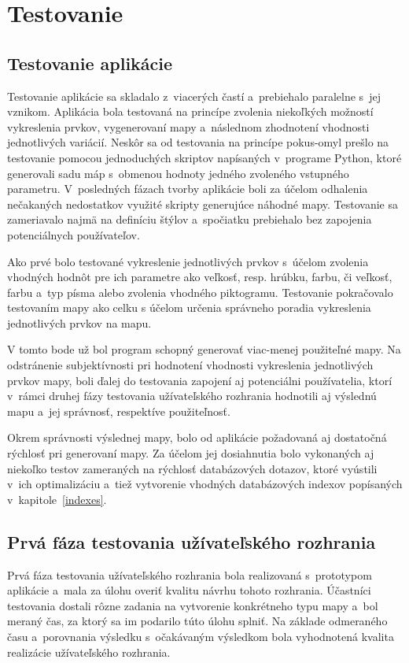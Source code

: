 \chapter{Testovanie}
\label{testing}
\section{Testovanie aplikácie}
Testovanie aplikácie sa skladalo z~viacerých častí a~prebiehalo paralelne s~jej vznikom. Aplikácia bola testovaná na princípe zvolenia niekoľkých možností vykreslenia prvkov, vygenerovaní mapy a~následnom zhodnotení vhodnosti jednotlivých variácií. Neskôr sa od testovania na princípe pokus-omyl prešlo na testovanie pomocou jednoduchých skriptov napísaných v~programe Python, ktoré generovali sadu máp s~obmenou hodnoty jedného zvoleného vstupného parametru. V~posledných fázach tvorby aplikácie boli za účelom odhalenia nečakaných nedostatkov využité skripty generujúce náhodné mapy. Testovanie sa zameriavalo najmä na definíciu štýlov a~spočiatku prebiehalo bez zapojenia potenciálnych používateľov.

Ako prvé bolo testované vykreslenie jednotlivých prvkov s~účelom zvolenia vhodných hodnôt pre ich parametre ako veľkosť, resp. hrúbku, farbu, či veľkosť, farbu a~typ písma alebo zvolenia vhodného piktogramu. Testovanie pokračovalo testovaním mapy ako celku s účelom určenia správneho poradia vykreslenia jednotlivých prvkov na mapu. 

V tomto bode už bol program schopný generovať viac-menej použiteľné mapy. Na odstránenie subjektívnosti pri hodnotení vhodnosti vykreslenia jednotlivých prvkov mapy, boli ďalej do testovania zapojení aj potenciálni používatelia, ktorí v~rámci druhej fázy testovania užívateľského rozhrania hodnotili aj výslednú mapu a~jej správnosť, respektíve použiteľnosť.

Okrem správnosti výslednej mapy, bolo od aplikácie požadovaná aj dostatočná rýchlosť pri generovaní mapy. Za účelom jej dosiahnutia bolo vykonaných aj niekoľko testov zameraných na rýchlosť databázových dotazov, ktoré vyústili v~ich optimalizáciu a~tiež vytvorenie vhodných databázových indexov popísaných v~kapitole~\ref{indexes}.


\section{Prvá fáza testovania užívateľského rozhrania}
\label{testing_1}
Prvá fáza testovania užívateľského rozhrania bola realizovaná s~prototypom aplikácie a~mala za úlohu overiť kvalitu návrhu tohoto rozhrania. Účastníci testovania dostali rôzne zadania na vytvorenie konkrétneho typu mapy a~bol meraný čas, za ktorý sa im podarilo túto úlohu splniť. Na základe odmeraného času a~porovnania výsledku s~očakávaným výsledkom bola vyhodnotená kvalita realizácie užívateľského rozhrania.

